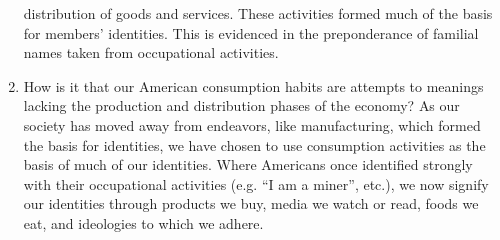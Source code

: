 \documentclass[12pt]{article}
\begin{document}
\begin{enumerate}
distribution of goods and services. These activities formed much of the basis
for members' identities. This is evidenced in the preponderance of familial
names taken from occupational activities.
\item How is it that our American consumption habits are attempts to meanings lacking the production and distribution phases of the economy?
\label{sec:org8f0c660}
As our society has moved away from endeavors, like manufacturing, which formed
the basis for identities, we have chosen to use consumption activities as the
basis of much of our identities. Where Americans once identified strongly with
their occupational activities (e.g. ``I am a miner'', etc.), we now signify our
identities through products we buy, media we watch or read, foods we eat, and
ideologies to which we adhere.
\end{enumerate}
\end{document}
